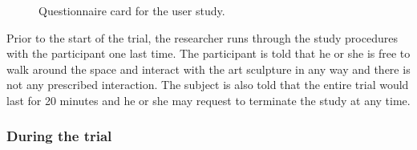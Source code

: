 \begin{figure} [!htb]
	\centering
	\caption[Questionnaire card for the user study]{Questionnaire card for the user study.}
	\label{fig:Questionaire-Card2}
\end{figure}

Prior to the start of the trial, the researcher runs through the study procedures with the participant one last time. The participant is told that he or she is free to walk around the space and interact with the art sculpture in any way and there is not any prescribed interaction. The subject is also told that the entire trial would last for 20 minutes and he or she may request to terminate the study at any time.


\subsubsection{During the trial}

